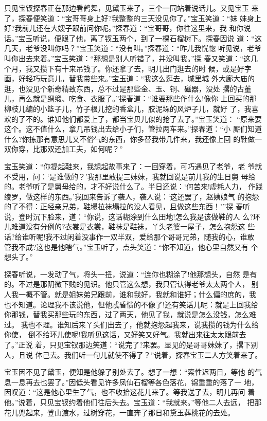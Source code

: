 只见宝钗探春正在那边看鹤舞，见黛玉来了，三个一同站着说话儿。又见宝玉
来了，探春便笑道：“宝哥哥身上好?我整整的三天没见你了。”宝玉笑道：“妹
妹身上好?我前儿还在大嫂子跟前问你呢。”探春道：“宝哥哥，你往这里来，我
和你说话。”宝玉听说，便跟了他，离了钗玉两个，到了一棵石榴树下。探春因说
道：“这几天，老爷没叫你吗？”宝玉笑道：“没有叫。”探春道：“昨儿我恍惚
听见说，老爷叫你出去来着。”宝玉笑道：“那想是别人听错了，并没叫我。”探
春又笑道：“这几个月，我又攒下有十来吊钱了。你还拿了去，明儿出门逛去的时
候，或是好字画，好轻巧玩意儿，替我带些来。”宝玉道：“我这么逛去，城里城
外大廊大庙的逛，也没见个新奇精致东西，总不过是那些金、玉、铜、磁器，没处
撂的古董儿，再么就是绸缎、吃食、衣服了。”探春道：“谁要那些作什么!像你
上回买的那柳枝儿编的小篮子儿，竹子根儿挖的香盒儿，胶泥垛的风炉子儿，就好
了，我喜欢的了不的。谁知他们都爱上了，都当宝贝儿似的抢了去了。”宝玉笑道：
“原来要这个。这不值什么，拿几吊钱出去给小子们，管拉两车来。”探春道：“小
厮们知道什么?你拣那有意思儿又不俗气的东西，你多替我带几件来，我还像上回
的鞋做一双你穿，比那双还加工夫，如何呢？”

宝玉笑道：“你提起鞋来，我想起故事来了：一回穿着，可巧遇见了老爷，老
爷就不受用，问：‘是谁做的？’我那里敢提三妹妹，我就回说是前儿我的生日舅
母给的。老爷听了是舅母给的，才不好说什么了。半日还说：‘何苦来!虚耗人力，
作践绫罗，做这样的东西。’我回来告诉了袭人，袭人说：‘这还罢了，赵姨娘气
的抱怨的了不得：正经亲兄弟，鞋塌拉袜塌拉的没人看见，且做这些东西！’”探
春听说，登时沉下脸来，道：“你说，这话糊涂到什么田地!怎么我是该做鞋的人
么?环儿难道没有分例的?衣裳是衣裳，鞋袜是鞋袜，丫头老婆一屋子，怎么抱怨这
些话?给谁听呢!我不过闲着没事作一双半双，爱给那个哥哥兄弟，随我的心，谁敢
管我不成?这也是他瞎气。”宝玉听了，点头笑道：“你不知道，他心里自然又有
个想头了。”

探春听说，一发动了气，将头一扭，说道：“连你也糊涂了!他那想头，自然
是有的。不过是那阴微下贱的见识。他只管这么想，我只管认得老爷太太两个人，
别人我一概不管。就是姐妹弟兄跟前，谁和我好，我就和谁好；什么偏的庶的，我
也不知道。论理我不该说他，但他忒昏愦的不像了!还有笑话儿呢：就是上回我给
你那钱，替我买那些玩的东西，过了两天，他见了我，就说是怎么没钱，怎么难过。
我也不理。谁知后来丫头们出去了，他就抱怨起我来，说我攒的钱为什么给你使，
倒不给环儿使呢!我听见这话，又好笑又好气。我就出来往太太跟前去了。”正说
着，只见宝钗那边笑道：“说完了?来罢。显见的是哥哥妹妹了，撂下别人，且说
体己去。我们听一句儿就使不得了？”说着，探春宝玉二人方笑着来了。

宝玉因不见了黛玉，便知是他躲了别处去了。想了一想：“索性迟两日，等他
的气息一息再去也罢了。”因低头看见许多凤仙石榴等各色落花，锦重重的落了一
地，因叹道：“这是他心里生了气，也不收拾这花儿来了。等我送了去，明儿再问
着他。”说着，只见宝钗约着他们往后头去。宝玉道：“我就来。”等他二人去远，
把那花儿兜起来，登山渡水，过树穿花，一直奔了那日和黛玉葬桃花的去处。

